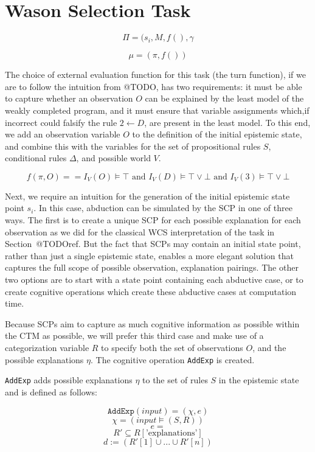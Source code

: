 \section{Wason Selection Task}

\[\Pi=(s_i,M,f(),\gamma\]



\[\mu=(\pi,f())\]

The choice of external evaluation function for this task (the turn function), if we are to follow the intuition from @TODO, has two requirements: it must be able to capture whether an observation $O$ can be explained by the least model of the weakly completed program, and it must ensure that variable assignments which,if incorrect could falsify the rule $2\leftarrow D$, are present in the least model. To this end, we add an observation variable $O$ to the definition of the initial epistemic state, and combine this with the variables for the set of propositional rules $S$, conditional rules $\Delta$, and possible world $V$.



\[f(\pi,O)==  I_V(O)\models \top \textrm{ and } I_V(D)\models \top \lor \bot \textrm{ and } I_V(3)\models \top \lor \bot\]



Next, we require an intuition for the generation of the initial epistemic state point $s_i$. In this case, abduction can be simulated by the SCP in one of three ways. The first is to create a unique SCP for each possible explanation for each observation as we did for the classical WCS interpretation of the task in Section~@TODOref. But the fact that SCPs may contain an initial state point, rather than just a single epistemic state, enables a more elegant solution that captures the full scope of possible observation, explanation pairings. The other two options are to start with a state point containing each abductive case, or to create cognitive operations which create these abductive cases at computation time.

Because SCPs aim to capture as much cognitive information as possible within the CTM as possible, we will prefer this third case and make use of a categorization variable $R$ to specify both the set of observations $O$, and the possible explanations $\eta$. The cognitive operation \texttt{AddExp} is created.

\texttt{AddExp} adds possible explanations $\eta$ to the set of rules $S$ in the epistemic state and is defined as follows:

\[\texttt{AddExp}(\textit{input})=(\chi,e)\]
\[\chi=(\textit{input}\models (S,R))\]
\[e=\]
\[R'\subseteq R[\textrm{'explanations'}]\]
\[d := (R'[1]\cup...\cup R'[n])\]

